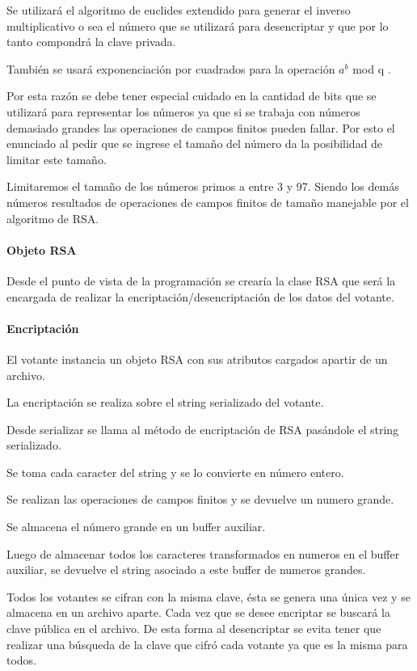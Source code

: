 \documentclass[a4paper,10pt]{article}
\begin{document}
Se utilizará el algoritmo de euclides extendido para generar el inverso multiplicativo o sea el número que se utilizará para desencriptar y que por lo tanto compondrá la clave privada.

También se usará exponenciación por cuadrados para la operación $a^b$ mod q .

Por esta razón se debe tener especial cuidado en la cantidad de bits que se utilizará para representar los números ya que si se trabaja con números demasiado grandes las operaciones de campos finitos pueden fallar. Por esto el enunciado al pedir que se ingrese el tamaño del número da la posibilidad de limitar este tamaño.

Limitaremos el tamaño de los números primos a entre 3 y 97. Siendo los demás números resultados de operaciones de campos finitos de tamaño manejable por el algoritmo de RSA.

\paragraph{Objeto RSA}

Desde el punto de vista de la programación se crearía la clase RSA que será la encargada de realizar la encriptación/desencriptación de los datos del votante.

\paragraph{Encriptación}
El votante instancia un objeto RSA con sus atributos cargados apartir de un archivo.

La encriptación se realiza sobre el string serializado del votante.

Desde serializar se llama al método de encriptación de RSA pasándole el string serializado.

Se toma cada caracter del string y se lo convierte en número entero.

Se realizan las operaciones de campos finitos y se devuelve un numero grande.

Se almacena el número grande en un buffer auxiliar.

Luego de almacenar todos los caracteres transformados en numeros en el buffer auxiliar, se devuelve el string asociado a este buffer de numeros grandes.

Todos los votantes se cifran con la misma clave, ésta se genera una única vez y se almacena en un archivo aparte. Cada vez que se desee encriptar se buscará la clave pública en el archivo. De esta forma al desencriptar se evita tener que realizar una búsqueda de la clave que cifró cada votante ya que es la misma para todos.
\end{document}
